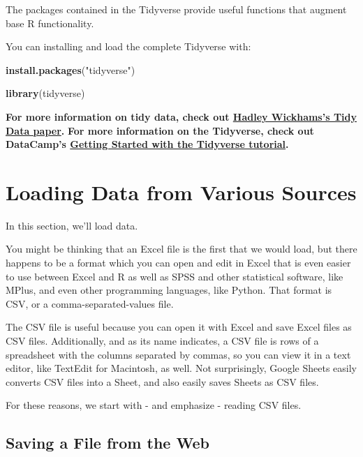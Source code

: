 \documentclass[]{book}
\newenvironment{Shaded}{\begin{snugshade}}{\end{snugshade}}
\newcommand{\KeywordTok}[1]{\textcolor[rgb]{0.13,0.29,0.53}{\textbf{#1}}}
\newcommand{\StringTok}[1]{\textcolor[rgb]{0.31,0.60,0.02}{#1}}
\newcommand{\NormalTok}[1]{#1}
\begin{document}
The packages contained in the Tidyverse provide useful functions that
augment base R functionality.

You can installing and load the complete Tidyverse with:

\begin{Shaded}
\begin{Highlighting}[]
\KeywordTok{install.packages}\NormalTok{(}\StringTok{"tidyverse"}\NormalTok{)}
\end{Highlighting}
\end{Shaded}

\begin{Shaded}
\begin{Highlighting}[]
\KeywordTok{library}\NormalTok{(tidyverse)}
\end{Highlighting}
\end{Shaded}

\textbf{For more information on tidy data, check out
\href{http://vita.had.co.nz/papers/tidy-data.html}{Hadley Wickhams's
Tidy Data paper}.} \textbf{For more information on the Tidyverse, check
out DataCamp's
\href{https://www.datacamp.com/community/tutorials/tidyverse-tutorial-r}{Getting
Started with the Tidyverse tutorial}.}

\section{Loading Data from Various
Sources}\label{loading-data-from-various-sources}

In this section, we'll load data.

You might be thinking that an Excel file is the first that we would
load, but there happens to be a format which you can open and edit in
Excel that is even easier to use between Excel and R as well as SPSS and
other statistical software, like MPlus, and even other programming
languages, like Python. That format is CSV, or a comma-separated-values
file.

The CSV file is useful because you can open it with Excel and save Excel
files as CSV files. Additionally, and as its name indicates, a CSV file
is rows of a spreadsheet with the columns separated by commas, so you
can view it in a text editor, like TextEdit for Macintosh, as well. Not
surprisingly, Google Sheets easily converts CSV files into a Sheet, and
also easily saves Sheets as CSV files.

For these reasons, we start with - and emphasize - reading CSV files.

\subsection{Saving a File from the
Web}\label{saving-a-file-from-the-web}
\end{document}
